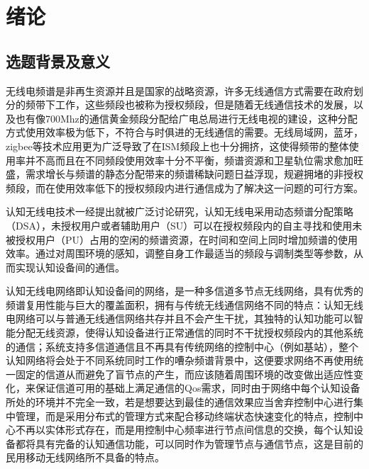 \documentclass[a4paper,AutoFakeBold,oneside,12pt]{book}
\begin{document}
  
\newpage

  
\newpage

  
\newpage

 
\newpage

\frontmatter\tableofcontents %

\newpage\mainmatter
{} %
\pagestyle{fancy} %


\chapter{绪论}
\section{选题背景及意义}
  无线电频谱是非再生资源并且是国家的战略资源，许多无线通信方式需要在政府划分的频带下工作，这些频段也被称为授权频段，但是随着无线通信技术的发展，以及也有像700Mhz的通信黄金频段分配给广电总局进行无线电视的建设，这种分配方式使用效率极为低下，不符合与时俱进的无线通信的需要。无线局域网，蓝牙，zigbee等技术应用更为广泛导致了在ISM频段上也十分拥挤，这使得频带的整体使用率并不高而且在不同频段使用效率十分不平衡，频谱资源和卫星轨位需求愈加旺盛，需求增长与频谱的静态分配带来的频谱稀缺问题日益浮现，规避拥堵的非授权频段，而在使用效率低下的授权频段内进行通信成为了解决这一问题的可行方案。

  认知无线电技术一经提出就被广泛讨论研究，认知无线电采用动态频谱分配策略（DSA），未授权用户或者辅助用户（SU）可以在授权频段内的自主寻找和使用未被授权用户（PU）占用的空闲的频谱资源，在时间和空间上同时增加频谱的使用效率。通过对周围环境的感知，调整自身工作最适当的频段与调制类型等参数，从而实现认知设备间的通信。

  认知无线电网络即认知设备间的网络，是一种多信道多节点无线网络，具有优秀的频谱复用性能与巨大的覆盖面积，拥有与传统无线通信网络不同的特点：认知无线电网络可以与普通无线通信网络共存并且不会产生干扰，其独特的认知功能可以智能分配无线资源，使得认知设备进行正常通信的同时不干扰授权频段内的其他系统的通信；系统支持多信道通信且不再具有传统网络的控制中心（例如基站），整个认知网络将会处于不同系统同时工作的嘈杂频谱背景中，这便要求网络不再使用统一固定的信道从而避免了盲节点的产生，而应该随着周围环境的改变做出适应性变化，来保证信道可用的基础上满足通信的Qos需求，同时由于网络中每个认知设备所处的环境并不完全一致，若是想要达到最佳的通信效果应当舍弃控制中心进行集中管理，而是采用分布式的管理方式来配合移动终端状态快速变化的特点，控制中心不再以实体形式存在，而是用控制中心频率进行节点间信息的交换，每个认知设备都将具有完备的认知通信功能，可以同时作为管理节点与通信节点，这是目前的民用移动无线网络所不具备的特点。
  
\end{document}
